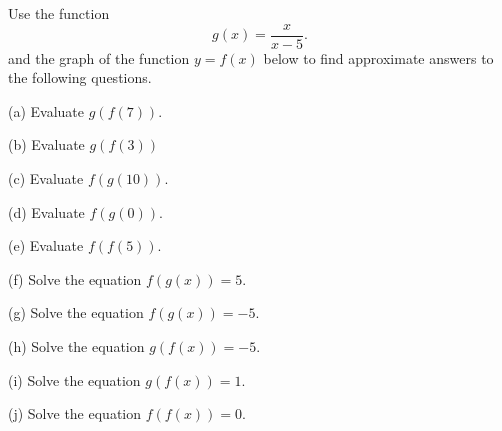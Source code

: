 \documentclass{ximera}
\begin{document}
\begin{example} \label{Ex2:Comp}
Use the function
\[
   g(x) = \frac{x}{x-5} .
\]
and the graph of the function $y=f(x)$ below to find approximate answers to the following questions.

(a) Evaluate $g(f(7))$.

(b) Evaluate $g(f(3))$

(c) Evaluate $f(g(10))$.

(d) Evaluate $f(g(0))$.

(e) Evaluate $f(f(5))$.

(f) Solve the equation $f(g(x))=5$.

(g) Solve the equation $f(g(x))=-5$.

(h) Solve the equation $g(f(x))=-5$.

(i) Solve the equation $g(f(x))=1$.

(j) Solve the equation $f(f(x))=0$.

 
\begin{onlineOnly}
    \begin{center}
\end{center}
\end{onlineOnly}

\end{example}
\end{document}
